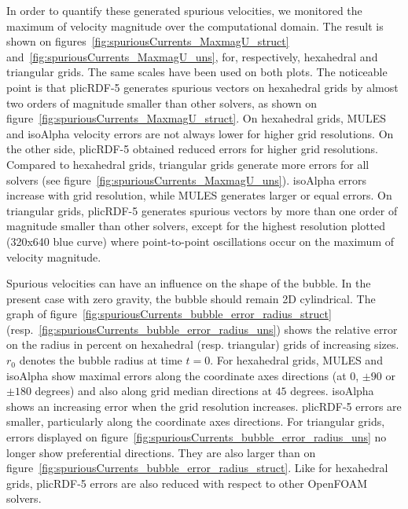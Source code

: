 \documentclass[review]{elsarticle}
\begin{document}
In order to quantify these generated spurious velocities, we monitored the maximum of velocity magnitude over the computational domain. The result is shown on figures~\ref{fig:spuriousCurrents_MaxmagU_struct} and~\ref{fig:spuriousCurrents_MaxmagU_uns}, for, respectively, hexahedral and triangular grids. The same scales have been used on both plots. The noticeable point is that plicRDF-5 generates spurious vectors on hexahedral grids by almost two orders of magnitude smaller than other solvers, as shown on figure~\ref{fig:spuriousCurrents_MaxmagU_struct}. On hexahedral grids, MULES and isoAlpha velocity errors are not always lower for higher grid resolutions. On the other side, plicRDF-5 obtained reduced errors for higher grid resolutions. Compared to hexahedral grids, triangular grids generate more errors for all solvers (see figure~\ref{fig:spuriousCurrents_MaxmagU_uns}). isoAlpha errors increase with grid resolution, while MULES generates larger or equal errors. On triangular grids, plicRDF-5 generates spurious vectors by more than one order of magnitude smaller than other solvers, except for the highest resolution plotted (320x640 blue curve) where point-to-point oscillations occur on the maximum of velocity magnitude. 

Spurious velocities can have an influence on the shape of the bubble. In the present case with zero gravity, the bubble should remain 2D cylindrical. The graph of figure~\ref{fig:spuriousCurrents_bubble_error_radius_struct} (resp.~\ref{fig:spuriousCurrents_bubble_error_radius_uns}) shows the relative error on the radius in percent on hexahedral (resp. triangular) grids of increasing sizes. $r_0$ denotes the bubble radius at time $t=0$. For hexahedral grids, MULES and isoAlpha show maximal errors along the coordinate axes directions (at $0$, $\pm 90$ or $\pm 180$ degrees) and also along grid median directions at $45$ degrees. isoAlpha shows an increasing error when the grid resolution increases. plicRDF-5 errors are smaller, particularly along the coordinate axes directions. For triangular grids, errors displayed on figure~\ref{fig:spuriousCurrents_bubble_error_radius_uns} no longer show preferential directions. They are also larger than on figure~\ref{fig:spuriousCurrents_bubble_error_radius_struct}. Like for hexahedral grids, plicRDF-5 errors are also reduced with respect to other OpenFOAM solvers. 
\end{document}
